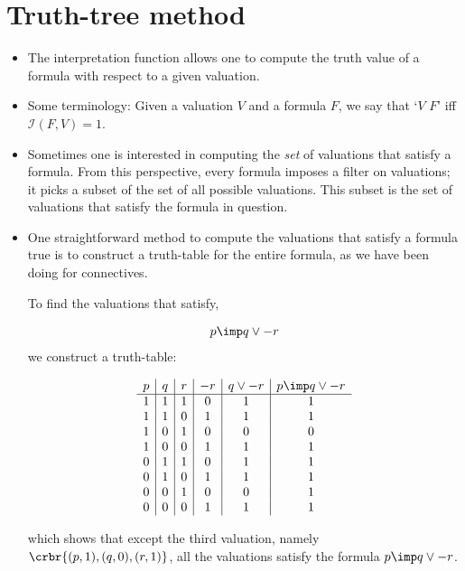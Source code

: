 \documentclass[11pt]{article}
\begin{document}
\section{Truth-tree method}

\begin{itemize}

\item The interpretation function allows one to compute the truth value of a
formula with respect to a given valuation.

\item Some terminology: Given a valuation $V$ and a formula $F$, we say that
`$V$  $F$'
iff $\mathcal{I}(F,V)= 1$. 

\item Sometimes one is interested in computing the \emph{set} of valuations that
satisfy a formula. From this perspective, every formula imposes a filter on valuations; it
picks a subset of the set of all possible valuations. This subset is the set of
valuations that satisfy the formula in question.

\item One straightforward method to compute the valuations that satisfy a formula
true is to construct a truth-table for the entire formula, as we have been doing
for connectives. 

\hrulefill
\begin{uexample}
To find the valuations that satisfy,  

\begin{align}\label{ttex}
p\imp q\lor -r
\end{align}
we construct a truth-table:

\[
\begin{array}{c|c|c|c|c|c}
p & q & r & -r & q\lor -r& p\imp q\lor -r\\ \hline
 1&1 & 1&0 &1 &1 \\
 1&1 & 0&1 &1 &1 \\
 1&0 & 1&0 &0 &0 \\
 1&0 & 0&1 &1 &1 \\
 0&1 & 1&0 &1 &1 \\
 0&1 & 0&1 &1 &1 \\
 0&0 & 1&0 &0 &1 \\
 0&0 & 0&1 &1 &1 
\end{array}
\]

which shows that except the third valuation, namely $\crbr{(p,1),(q,0),(r,1)}$,
all the valuations satisfy the formula $p\imp q\lor -r$.


\end{uexample}
\end{itemize}
\end{document}
